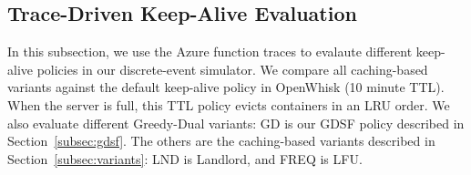 \subsection{Trace-Driven Keep-Alive Evaluation}

In this subsection, we use the Azure function traces to evalaute different keep-alive policies in our discrete-event simulator. 
We compare all caching-based variants against the default keep-alive policy in OpenWhisk (10 minute TTL).
When the server is full, this TTL policy evicts containers in an LRU order.
We also evaluate different Greedy-Dual variants: GD is our GDSF policy described in Section~\ref{subsec:gdsf}.
The others are the caching-based variants described in Section~\ref{subsec:variants}: LND is Landlord, and FREQ is LFU. 


